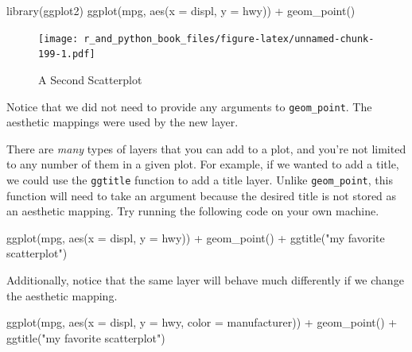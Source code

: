 \documentclass[
  12pt,
  krantz2]{krantz}
\makeatletter
\newenvironment{Shaded}{\begin{snugshade}}{\end{snugshade}}
\newcommand{\AttributeTok}[1]{\textcolor[rgb]{0.61,0.61,0.61}{#1}}
\newcommand{\FunctionTok}[1]{\textcolor[rgb]{0,0,0}{#1}}
\newcommand{\NormalTok}[1]{#1}
\newcommand{\SpecialCharTok}[1]{\textcolor[rgb]{0,0,0}{#1}}
\newcommand{\StringTok}[1]{\textcolor[rgb]{0.5,0.5,0.5}{#1}}
\newenvironment{kframe}{%
\medskip{}
\setlength{\fboxsep}{.8em}
 \def\at@end@of@kframe{}%
 \ifinner\ifhmode%
  \def\at@end@of@kframe{\end{minipage}}%
  \begin{minipage}{\columnwidth}%
 \fi\fi%
 \def\FrameCommand##1{\hskip\@totalleftmargin \hskip-\fboxsep
 \colorbox{shadecolor}{##1}\hskip-\fboxsep
     \hskip-\linewidth \hskip-\@totalleftmargin \hskip\columnwidth}%
 \MakeFramed {\advance\hsize-\width
   \@totalleftmargin\z@ \linewidth\hsize
   \@setminipage}}%
 {\par\unskip\endMakeFramed%
 \at@end@of@kframe}
\renewenvironment{Shaded}{\begin{kframe}}{\end{kframe}}
\makeatother
\begin{document}
\begin{Shaded}
\begin{Highlighting}[]
\FunctionTok{library}\NormalTok{(ggplot2)}
\FunctionTok{ggplot}\NormalTok{(mpg, }\FunctionTok{aes}\NormalTok{(}\AttributeTok{x =}\NormalTok{ displ, }\AttributeTok{y =}\NormalTok{ hwy))  }\SpecialCharTok{+}
  \FunctionTok{geom\_point}\NormalTok{()}
\end{Highlighting}
\end{Shaded}

\begin{figure}
\centering
\texttt{[image: r\_and\_python\_book\_files/figure-latex/unnamed-chunk-199-1.pdf]}
\caption{\label{fig:unnamed-chunk-199}A Second Scatterplot}
\end{figure}

Notice that we did not need to provide any arguments to \texttt{geom\_point}. The aesthetic mappings were used by the new layer.

There are \emph{many} types of layers that you can add to a plot, and you're not limited to any number of them in a given plot. For example, if we wanted to add a title, we could use the \texttt{ggtitle} function to add a title layer. Unlike \texttt{geom\_point}, this function will need to take an argument because the desired title is not stored as an aesthetic mapping. Try running the following code on your own machine.

\begin{Shaded}
\begin{Highlighting}[]
\FunctionTok{ggplot}\NormalTok{(mpg, }\FunctionTok{aes}\NormalTok{(}\AttributeTok{x =}\NormalTok{ displ, }\AttributeTok{y =}\NormalTok{ hwy))  }\SpecialCharTok{+}
  \FunctionTok{geom\_point}\NormalTok{() }\SpecialCharTok{+} 
  \FunctionTok{ggtitle}\NormalTok{(}\StringTok{"my favorite scatterplot"}\NormalTok{)}
\end{Highlighting}
\end{Shaded}

Additionally, notice that the same layer will behave much differently if we change the aesthetic mapping.

\begin{Shaded}
\begin{Highlighting}[]
\FunctionTok{ggplot}\NormalTok{(mpg, }\FunctionTok{aes}\NormalTok{(}\AttributeTok{x =}\NormalTok{ displ, }\AttributeTok{y =}\NormalTok{ hwy, }\AttributeTok{color =}\NormalTok{ manufacturer))  }\SpecialCharTok{+}
  \FunctionTok{geom\_point}\NormalTok{() }\SpecialCharTok{+} 
  \FunctionTok{ggtitle}\NormalTok{(}\StringTok{"my favorite scatterplot"}\NormalTok{)}
\end{Highlighting}
\end{Shaded}
\end{document}
